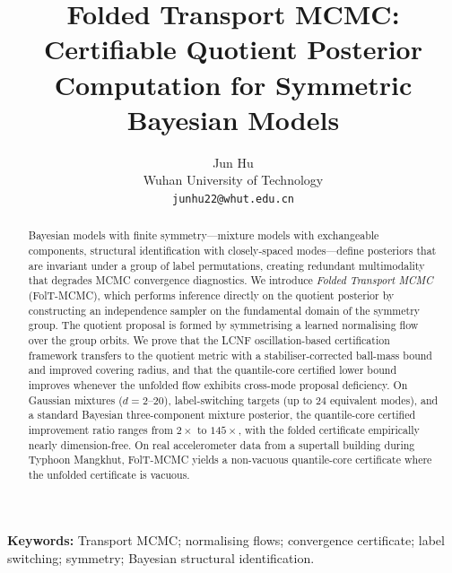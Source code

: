 \documentclass[a4paper,12pt]{article}
\title{Folded Transport MCMC: Certifiable Quotient Posterior
  Computation for Symmetric Bayesian Models}
\author{Jun Hu \\
  {\small Wuhan University of Technology} \\
  {\small \texttt{junhu22@whut.edu.cn}}}
\date{}
\theoremstyle{definition}
\theoremstyle{remark}
\begin{document}
\maketitle

\begin{abstract}
Bayesian models with finite symmetry---mixture models with
exchangeable components, structural identification with
closely-spaced modes---define posteriors that are invariant under
a group of label permutations, creating redundant multimodality
that degrades MCMC convergence diagnostics.
We introduce \emph{Folded Transport MCMC} (FolT-MCMC), which
performs inference directly on the quotient posterior by
constructing an independence sampler on the fundamental domain
of the symmetry group.  The quotient proposal is formed by
symmetrising a learned normalising flow over the group orbits.
We prove that the LCNF oscillation-based certification framework
transfers to the quotient metric with a stabiliser-corrected
ball-mass bound and improved covering radius, and that the
quantile-core certified lower bound improves whenever the
unfolded flow exhibits cross-mode proposal deficiency.
On Gaussian mixtures ($d = 2$--$20$), label-switching targets
(up to $24$ equivalent modes), and a standard Bayesian
three-component mixture posterior, the quantile-core certified
improvement ratio ranges from $2\times$ to $145\times$, with the
folded certificate empirically nearly dimension-free.
On real accelerometer data from a supertall building during
Typhoon Mangkhut, FolT-MCMC yields a non-vacuous quantile-core
certificate where the unfolded certificate is vacuous.
\end{abstract}

\noindent
\textbf{Keywords:}
Transport MCMC; normalising flows; convergence certificate;
label switching; symmetry; Bayesian structural identification.

\bigskip











\newpage

\end{document}
